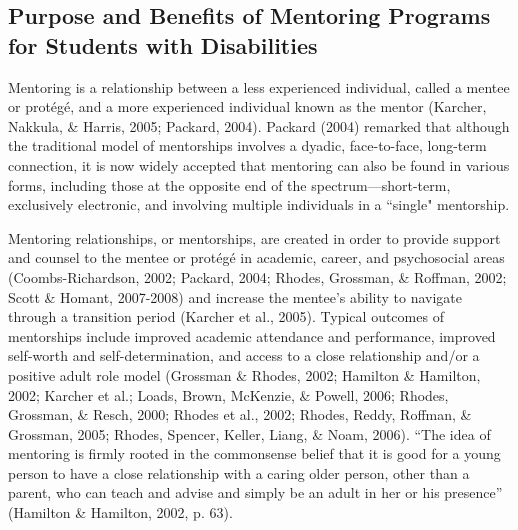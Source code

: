 \documentclass[11.5pt]{sig-alternate} %
\begin{document}
\begin{large}
\subsection*{Purpose and Benefits of Mentoring Programs for Students with Disabilities}
Mentoring is a relationship between a less experienced individual, called a mentee or protégé, and a more experienced individual known as the mentor (Karcher, Nakkula, \& Harris, 2005; Packard, 2004). Packard (2004) remarked that although the traditional model of mentorships involves a dyadic, face-to-face, long-term connection, it is now widely accepted that mentoring can also be found in various forms, including those at the opposite end of the spectrum—short-term, exclusively electronic, and involving multiple individuals in a ``single" mentorship.

Mentoring relationships, or mentorships, are created in order to provide support and counsel to the mentee or protégé in academic, career, and psychosocial areas (Coombs-Richardson, 2002; Packard, 2004; Rhodes, Grossman, \& Roffman, 2002; Scott \& Homant, 2007-2008) and increase the mentee's ability to navigate through a transition period (Karcher et al., 2005). Typical outcomes of mentorships include improved academic attendance and performance, improved self-worth and self-determination, and access to a close relationship and/or a positive adult role model (Grossman \& Rhodes, 2002; Hamilton \& Hamilton, 2002; Karcher et al.; Loads, Brown, McKenzie, \& Powell, 2006; Rhodes, Grossman, \& Resch, 2000; Rhodes et al., 2002; Rhodes, Reddy, Roffman, \& Grossman, 2005; Rhodes, Spencer, Keller, Liang, \& Noam, 2006). “The idea of mentoring is firmly rooted in the commonsense belief that it is good for a young person to have a close relationship with a caring older person, other than a parent, who can teach and advise and simply be an adult in her or his presence” (Hamilton \& Hamilton, 2002, p. 63).


\end{large}
\end{document}
